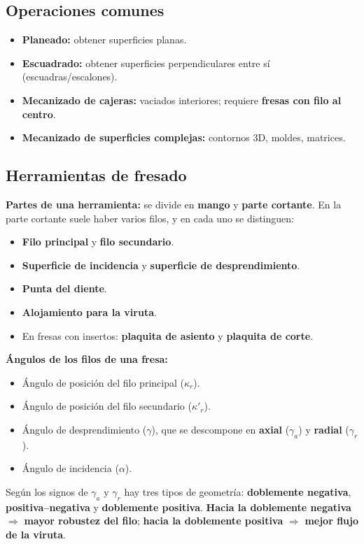 \documentclass[12pt,a4paper]{article}
\begin{document}
\subsection{Operaciones comunes}
\begin{itemize}
	\item \textbf{Planeado:} obtener superficies planas.
	\item \textbf{Escuadrado:} obtener superficies perpendiculares entre sí
	      (escuadras/escalones).
	\item \textbf{Mecanizado de cajeras:} vaciados interiores; requiere
	      \textbf{fresas con filo al centro}.
	\item \textbf{Mecanizado de superficies complejas:} contornos 3D, moldes,
	      matrices.
\end{itemize}

\subsection{Herramientas de fresado}
\textbf{Partes de una herramienta:} se divide en \textbf{mango} y \textbf{parte
	cortante}. En la parte cortante suele haber varios filos, y en cada uno se
distinguen:
\begin{itemize}
	\item \textbf{Filo principal} y \textbf{filo secundario}.
	\item \textbf{Superficie de incidencia} y \textbf{superficie de
		      desprendimiento}.
	\item \textbf{Punta del diente}.
	\item \textbf{Alojamiento para la viruta}.
	\item En fresas con insertos: \textbf{plaquita de asiento} y \textbf{plaquita
		      de corte}.
\end{itemize}

\textbf{Ángulos de los filos de una fresa:}
\begin{itemize}
	\item Ángulo de posición del filo principal ($\kappa_r$).
	\item Ángulo de posición del filo secundario ($\kappa'_r$).
	\item Ángulo de desprendimiento ($\gamma$), que se descompone en
	      \textbf{axial} ($\gamma_a$) y \textbf{radial} ($\gamma_r$).
	\item Ángulo de incidencia ($\alpha$).
\end{itemize}
Según los signos de $\gamma_a$ y $\gamma_r$ hay tres tipos de geometría:
\textbf{doblemente negativa}, \textbf{positiva--negativa} y \textbf{doblemente
	positiva}. \textbf{Hacia la doblemente negativa} $\Rightarrow$ \textbf{mayor
	robustez del filo}; \textbf{hacia la doblemente positiva} $\Rightarrow$
\textbf{mejor flujo de la viruta}.
\end{document}
